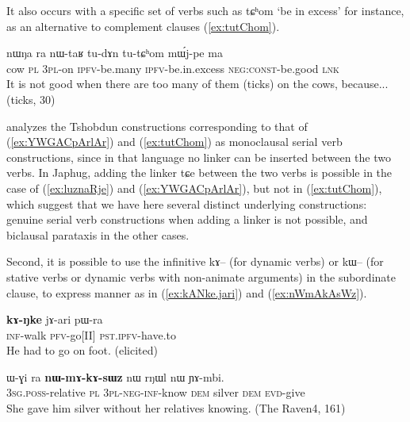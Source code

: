 \documentclass[oldfontcommands,oneside,a4paper,11pt]{article}
\newcommand{\ipa}[1]{{\phon \mbox{#1}}} %
\newcommand{\refb}[1]{(\ref{#1})}
\begin{document}
It also occurs with a specific set of verbs such as \ipa{tɕʰom} `be in excess' for instance, as an alternative to complement clauses \refb{ex:tutChom}.

\begin{exe}
\ex \label{ex:tutChom}
\gll
\ipa{nɯŋa} 	\ipa{ra} 	\ipa{nɯ-taʁ} 	\ipa{tu-dɤn} 	\ipa{tu-tɕʰom} 	\ipa{mɯ́j-pe} 	\ipa{ma} \\
cow \textsc{pl} \textsc{3pl}-on \textsc{ipfv}-be.many \textsc{ipfv}-be.in.excess \textsc{neg:const}-be.good \textsc{lnk} \\
\glt It is not good when there are too many of them (ticks) on the cows, because... (ticks, 30)
\end{exe}

 \citet{sun12complementation} analyzes the  Tshobdun constructions     corresponding to that of \refb{ex:YWGACpArlAr} and \refb{ex:tutChom} as monoclausal serial verb constructions, since in that language no linker can be inserted between the two verbs. In Japhug,   adding the linker \ipa{tɕe} between the two verbs is possible in the case of \refb{ex:luznaRje} and \refb{ex:YWGACpArlAr}, but not in \refb{ex:tutChom}, which suggest that we have here several distinct underlying constructions: genuine serial verb constructions when adding a linker is not possible, and biclausal parataxis in the other cases. 


Second, it is possible to use the infinitive \ipa{kɤ--} (for dynamic verbs) or \ipa{kɯ--} (for stative verbs or dynamic verbs with non-animate arguments) in the subordinate clause, to express manner as in \refb{ex:kANke.jari} and \refb{ex:nWmAkAsWz}.

\begin{exe}
\ex \label{ex:kANke.jari}
\gll
\ipa{\textbf{kɤ-ŋke}} 	\ipa{jɤ-ari} 	\ipa{pɯ-ra} \\
\textsc{inf}-walk \textsc{pfv}-go[II] \textsc{pst.ipfv}-have.to \\
\glt He had to go on foot. (elicited)
\end{exe}

 
\begin{exe}
\ex \label{ex:nWmAkAsWz}
\gll
\ipa{ɯ-ɣi}   	\ipa{ra}   	\ipa{\textbf{nɯ-mɤ-kɤ-sɯz}}   	\ipa{nɯ}   	\ipa{rŋɯl}   	\ipa{nɯ}   	\ipa{ɲɤ-mbi.}\\
\textsc{3sg.poss}-relative \textsc{pl} \textsc{3pl-neg-inf}-know \textsc{dem} silver \textsc{dem} \textsc{evd}-give\\
\glt  She gave him silver without her relatives knowing. (The Raven4, 161)
\end{exe}
\end{document}
